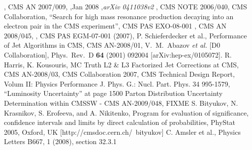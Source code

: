 \documentclass{cmspaper}
\begin{document}
\begin{linenumbers}
\begin{thebibliography}{}
, CMS AN 2007/009,
,Jan 2008 ,{\em arXiv 0411038v2}
, CMS NOTE 2006/040,
 {CMS Collaboration, ``Search for high mass resonance production decaying into an electron pair in the CMS experiment''}, CMS PAS EXO-08-001
, CMS AN 2008/045,
, CMS PAS EGM-07-001 (2007),
 {P. Schieferdecker et al., Performance of Jet Algorithms in CMS}, CMS AN-2008/01,
  V.~M.~Abazov {\it et al.}  [D0 Collaboration], 	 
  Phys.\ Rev.\  D {\bf 64} (2001) 092004 	 
  [arXiv:hep-ex/0105072]. 	 
 {R. Harris, K. Kousouris, MC Truth L2 \& L3 Factorized Jet Corrections at CMS}, CMS AN-2008/03,
 {CMS Collaboration 2007, CMS Technical Design Report, Volum II: Physics Performance} 
J. Phys. G.: Nucl. Part. Phys. 34 995-1579, ``Luminosity Uncertainty'' at page 1500
 {Parton Distribution Uncertainty Determination within CMSSW - CMS AN-2009/048}, FIXME
 S. Bityukov, N. Krasnikov, S. Erofeeva, and A. Nikitenko, Program for evaluation of significance,
  confidence intervals and limits by direct calculation of probabilities, PhyStat 2005, Oxford, UK 
  [http://cmsdoc.cern.ch/~bityukov]
  C. Amsler et al., Physics Letters B667, 1 (2008), section 32.3.1
  
\end{thebibliography}

\end{linenumbers}
\end{document}
